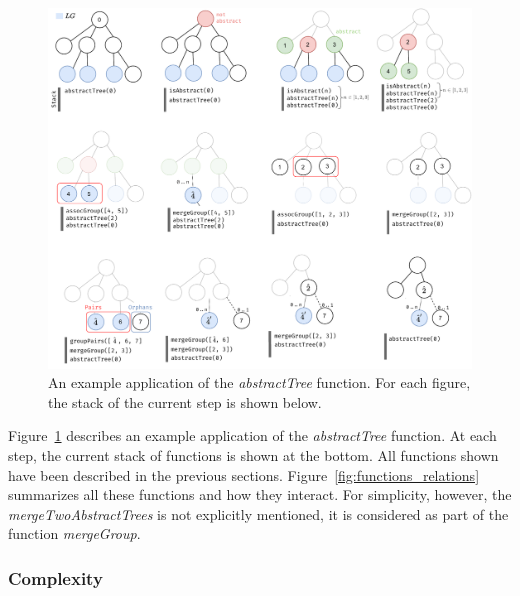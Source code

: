 \begin{figure}[]
  \centering
  \includegraphics[width=0.8\linewidth]{appstract/explanations/steps_abstractTree}
  \caption{An example application of the \emph{abstractTree} function. For each figure, the stack of the current step is shown below.}
  \label{fig:steps_abstractTree}
\end{figure}

Figure~\ref{fig:steps_abstractTree} describes an example application of the \emph{abstractTree} function.
At each step, the current stack of functions is shown at the bottom.
All functions shown have been described in the previous sections.
Figure~\ref{fig:functions_relations} summarizes all these functions and how they interact.
For simplicity, however, the \emph{mergeTwoAbstractTrees} is not explicitly mentioned, it is considered as part of the function \emph{mergeGroup}.

\subsubsection{Complexity}



